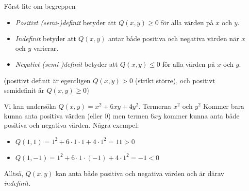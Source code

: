 \documentclass[../../main.tex]{subfiles}
\begin{document}
\begin{solution}{18}
Först lite om begreppen
\begin{itemize}
    \item \textit{Positivt (semi-)definit} betyder att $Q(x, y) \geq 0$ för alla värden på $x$ och $y$.
    \item \textit{Indefinit} betyder att $Q(x, y)$ antar både positiva och negativa värden när $x$ och $y$ varierar.
    \item \textit{Negativt (semi-)definit} betyder att $Q(x, y) \leq 0$ för alla värden på $x$ och $y$.
\end{itemize}

(positivt definit är egentligen $Q(x, y) > 0$ (strikt större), och positivt semidefinit är $Q(x, y) \geq 0$)

Vi kan undersöka $Q(x, y) = x^2 + 6xy + 4y^2$. Termerna $x^2$ och $y^2$ Kommer bara kunna anta positiva värden (eller 0) men termen $6xy$ kommer kunna anta både positiva och negativa värden. Några exempel:
\begin{itemize}
    \item $Q(1,1) = 1^2 + 6\cdot1\cdot1 + 4\cdot 1^2 = 11 > 0$
    \item $Q(1,-1) = 1^2 + 6\cdot1\cdot(-1) + 4\cdot 1^2 = -1 < 0$
\end{itemize}

Alltså, $Q(x, y)$ kan anta både positiva och negativa värden och är därav \textit{indefinit}.

\end{solution}
\end{document}

